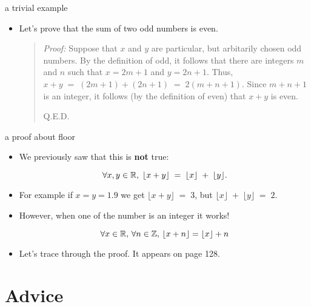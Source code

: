 \documentclass[landscape]{beamer}
\begin{document}
\begin{frame}{a trivial example}
\begin{itemize}
\item Let's prove that the sum of two odd numbers is even. \pause

\vfill

\begin{quote}
{\em Proof:} Suppose that $x$ and $y$ are particular, but arbitarily chosen odd numbers.  By the definition of odd, it follows that there are integers $m$ and $n$ such that $x=2m+1$ and $y=2n+1$.  Thus, $x+y \; = \; (2m+1) + (2n+1) \; = \; 2(m+n+1)$.  Since $m+n+1$ is an integer, it follows (by the definition of even) that $x+y$ is even.

\hspace{\fill} Q.E.D. 
\end{quote}

\vfill

\end{itemize}
\end{frame}

\begin{frame}{a proof about floor}
\begin{itemize}
\item We previously saw that this is {\bf not} true: \pause

\[ \forall x, y \in {\mathbb R}, \; \lfloor x + y \rfloor \; = \; \lfloor x \rfloor \; + \; \lfloor y \rfloor. \] \pause

\item For example if $x=y=1.9$ we get $\displaystyle \lfloor x + y \rfloor \; = \; 3$, but  $\displaystyle \lfloor x \rfloor \; + \; \lfloor y \rfloor \; = \; 2$. \pause

\item However, when one of the number is an integer it works! \pause

\begin{thm}
\[ \forall x \in {\mathbb R}, \, \forall n \in {\mathbb Z}, \, 
\lfloor x + n \rfloor = \lfloor x \rfloor + n \]
\end{thm}
\pause
\item Let's trace through the proof. It appears on page 128. 
\end{itemize}
\end{frame}

\section{Advice}
\end{document}
